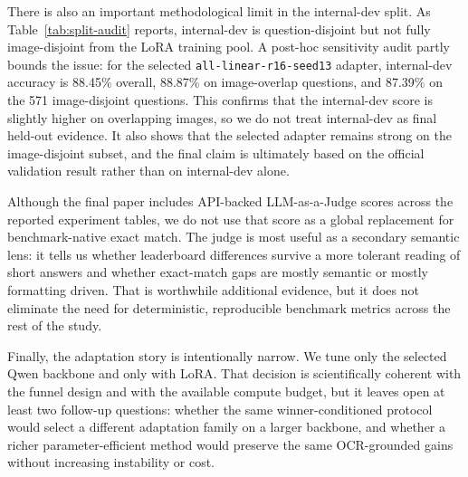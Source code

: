 There is also an important methodological limit in the internal-dev split. As Table~\ref{tab:split-audit} reports, internal-dev is question-disjoint but not fully image-disjoint from the LoRA training pool. A post-hoc sensitivity audit partly bounds the issue: for the selected \texttt{all-linear-r16-seed13} adapter, internal-dev accuracy is 88.45\% overall, 88.87\% on image-overlap questions, and 87.39\% on the 571 image-disjoint questions. This confirms that the internal-dev score is slightly higher on overlapping images, so we do not treat internal-dev as final held-out evidence. It also shows that the selected adapter remains strong on the image-disjoint subset, and the final claim is ultimately based on the official validation result rather than on internal-dev alone.

Although the final paper includes API-backed LLM-as-a-Judge scores across the reported experiment tables, we do not use that score as a global replacement for benchmark-native exact match. The judge is most useful as a secondary semantic lens: it tells us whether leaderboard differences survive a more tolerant reading of short answers and whether exact-match gaps are mostly semantic or mostly formatting driven. That is worthwhile additional evidence, but it does not eliminate the need for deterministic, reproducible benchmark metrics across the rest of the study.

Finally, the adaptation story is intentionally narrow. We tune only the selected Qwen backbone and only with LoRA. That decision is scientifically coherent with the funnel design and with the available compute budget, but it leaves open at least two follow-up questions: whether the same winner-conditioned protocol would select a different adaptation family on a larger backbone, and whether a richer parameter-efficient method would preserve the same OCR-grounded gains without increasing instability or cost.
